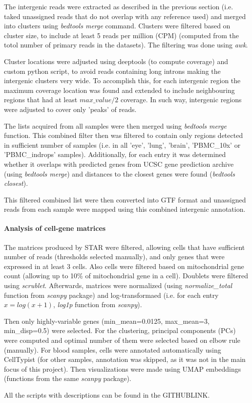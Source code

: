 The intergenic reads were extracted as described in the previous section (i.e. taked unassigned reads that do not overlap with any reference used)
and merged into clusters using \textit{bedtools merge} command.
Clusters were filtered based on cluster size, to include at least 5 reads per million (CPM)
(computed from the totol number of primary reads in the datasets).
The filtering was done using \textit{awk}.

Cluster locations were adjusted using deeptools (to compute coverage) and custom python script,
to avoid reads containing long introns making the intergenic clusters very wide.
To accomplish this, for each intergenic region the maximum coverage location was found and extended to include neighbouring regions that had
at least $max\_value / 2$ coverage.
In such way, intergenic regions were adjusted to cover only 'peaks' of reads.

The lists acquired from all samples were then merged using \textit{bedtools merge} function.
This combined filter then was filtered to contain only regions detected in sufficient number of samples
(i.e. in all 'eye', 'lung', 'brain', 'PBMC\_10x' or 'PBMC\_indrops' samples).
Additionally, for each entry it was determined whether it overlaps with predicted genes from UCSC gene prediction archive
(using \textit{bedtools merge}) and distances to the closest genes were found (\textit{bedtools closest}).

This filtered combined list were then converted into GTF format and unassigned reads from each sample were mapped using this
combined intergenic annotation.

\paragraph{Analysis of cell-gene matrices}

The matrices produced by STAR were filtered, allowing cells that have sufficient number of reads (thresholds selected manually),
and only genes that were expressed in at least 3 cells.
Also cells were filtered based on mitochondrial gene count (allowing up to 10\% of mitochondrial gene in a cell).
Doublets were filtered using \textit{scrublet}.
Afterwards, matrices were normalized (using \textit{normalize\_total} function from \textit{scanpy} package) and log-transformaed
(i.e. for each entry $x = log(x+1)$, \textit{log1p} function from \textit{scanpy}).

Then only highly-variable genes (min\_mean=0.0125, max\_mean=3, min\_disp=0.5) were selected.
For the clustering, principal components (PCs) were computed and optimal number of them were selected based on elbow rule (manually).
For blood samples, cells were annotated automatically using CellTypist
(for other samples, annotation was skipped, as it was not in the main focus of this project).
Then visualizations were made using UMAP embeddings (functions from the same \textit{scanpy} package).

All the scripts with descriptions can be found in the GITHUBLINK.
